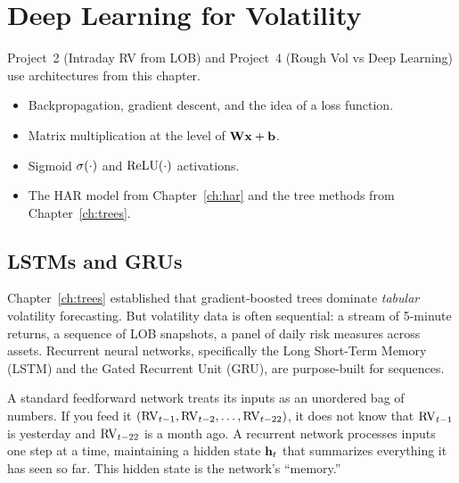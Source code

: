 
\chapter{Deep Learning for Volatility}\label{ch:deeplearning}

\begin{application}
Project~2 (Intraday RV from LOB) and Project~4 (Rough Vol vs Deep Learning) use architectures from this chapter.
\end{application}

\begin{prereq}
\begin{itemize}[nosep]
  \item Backpropagation, gradient descent, and the idea of a loss function.
  \item Matrix multiplication at the level of $\mathbf{W} \mathbf{x} + \mathbf{b}$.
  \item Sigmoid $\sigma(\cdot)$ and $\operatorname{ReLU}(\cdot)$ activations.
  \item The HAR model from Chapter~\ref{ch:har} and the tree methods from Chapter~\ref{ch:trees}.
\end{itemize}
\end{prereq}

\section{LSTMs and GRUs}\label{sec:dl:lstm}

Chapter~\ref{ch:trees} established that gradient-boosted trees dominate \emph{tabular} volatility forecasting.
But volatility data is often sequential: a stream of 5-minute returns, a sequence of LOB snapshots, a panel of daily risk measures across assets.
Recurrent neural networks, specifically the Long Short-Term Memory (LSTM) and the Gated Recurrent Unit (GRU), are purpose-built for sequences.

\begin{intuition}
A standard feedforward network treats its inputs as an unordered bag of numbers.
If you feed it $(\operatorname{RV}_{t-1}, \operatorname{RV}_{t-2}, \ldots, \operatorname{RV}_{t-22})$, it does not know that $\operatorname{RV}_{t-1}$ is yesterday and $\operatorname{RV}_{t-22}$ is a month ago.
A recurrent network processes inputs one step at a time, maintaining a hidden state $\mathbf{h}_t$ that summarizes everything it has seen so far.
This hidden state is the network's ``memory.''
\end{intuition}

